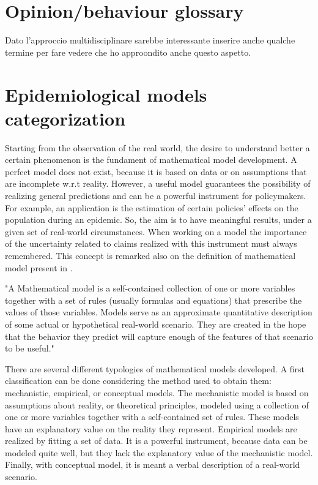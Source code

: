 \section{Opinion/behaviour glossary}
Dato l'approccio multidisciplinare sarebbe interessante inserire anche qualche termine per fare vedere che ho approondito anche questo aspetto. 

\section{Epidemiological models categorization}
Starting from the observation of the real world, the desire to understand better a certain phenomenon is the fundament of mathematical model development. A perfect model does not exist, because it is based on data or on assumptions that are incomplete w.r.t reality. However, a useful model guarantees the possibility of realizing general predictions and can be a powerful instrument for policymakers.  For example, an application is the estimation of certain policies' effects on the population during an epidemic. So, the aim is to have meaningful results, under a given set of real-world circumstances.
When working on a model the importance of the uncertainty related to claims realized with this instrument must always remembered. This concept is remarked also on the definition of mathematical model present in \cite{Ledder_2023}. 
\begin{displayquote}
	"A Mathematical model is a self-contained collection of one or more variables together with a set of rules (usually formulas and equations) that prescribe the values of those variables. Models serve as an approximate quantitative description of some actual or hypothetical real-world scenario. They are created in the hope that the behavior they predict will capture enough of the features of that scenario to be useful."
\end{displayquote}

There are several different typologies of mathematical models developed.
A first classification can be done considering the method used to obtain them: mechanistic, empirical, or conceptual models.
The mechanistic model is based on assumptions about reality, or theoretical principles, modeled using a collection of one or more variables together with a self-contained set of rules. These models have an explanatory value on the reality they represent.
Empirical models are realized by fitting a set of data. It is a powerful instrument, because data can be modeled quite well, but they lack the explanatory value of the mechanistic model.  Finally, with conceptual model, it is meant a verbal description of a real-world scenario. 

